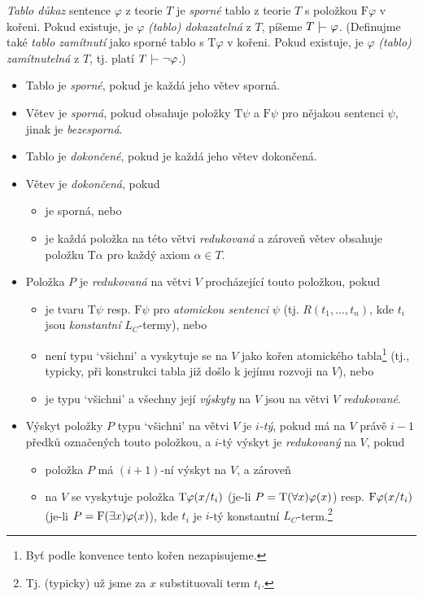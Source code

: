 \begin{definition}
    \emph{Tablo důkaz} sentence $\varphi$ z teorie $T$ je \emph{sporné} tablo z teorie $T$ s položkou $\mathrm{F}\varphi$ v kořeni. Pokud existuje, je $\varphi$ \emph{(tablo) dokazatelná} z $T$, píšeme $T\proves\varphi$. (Definujme také \emph{tablo zamítnutí} jako sporné tablo s $\mathrm{T}\varphi$ v kořeni. Pokud existuje, je $\varphi$ \emph{(tablo) zamítnutelná} z $T$, tj. platí $T\proves\neg\varphi$.)  
    \begin{itemize}
        \item Tablo je \emph{sporné}, pokud je každá jeho větev sporná.
        \item Větev je \emph{sporná}, pokud obsahuje položky $\mathrm{T}\psi$ a $\mathrm{F}\psi$ pro nějakou sentenci $\psi$, jinak je \emph{bezesporná}.
        \item Tablo je \emph{dokončené}, pokud je každá jeho větev dokončená.
        \item Větev je \emph{dokončená}, pokud 
        \begin{itemize}
            \item je sporná, nebo
            \item je každá položka na této větvi \emph{redukovaná} a zároveň větev obsahuje položku $\mathrm{T}\alpha$ pro každý axiom $\alpha\in T$.
        \end{itemize}
         
        \item Položka $P$ je \emph{redukovaná} na větvi $V$ procházející touto položkou, pokud 
        \begin{itemize}
            \item je tvaru $\mathrm{T}\psi$ resp. $\mathrm{F}\psi$ pro \emph{atomickou sentenci} $\psi$ (tj. $R(t_1,\dots,t_n)$, kde $t_i$ jsou \emph{konstantní} $L_C$-termy), nebo
            \item není typu `všichni' a vyskytuje se na $V$ jako kořen atomického tabla\footnote{Byť podle konvence tento kořen nezapisujeme.} (tj., typicky, při konstrukci tabla již došlo k jejímu rozvoji na $V$), nebo
            \item je typu `všichni' a všechny její \emph{výskyty} na $V$ jsou na větvi $V$ \emph{redukované}.
        \end{itemize}
        \item Výskyt položky $P$ typu `všichni' na větvi $V$ je \emph{$i$-tý}, pokud má na $V$ právě $i-1$ předků označených touto položkou, a $i$-tý výskyt je \emph{redukovaný} na $V$, pokud
        \begin{itemize}
            \item položka $P$ má $(i+1)$-ní výskyt na $V$, a zároveň
            \item na $V$ se vyskytuje položka $\mathrm{T}\varphi(x/t_i)$ (je-li $P=\mathrm{T}(\forall x)\varphi(x)$) resp. $\mathrm{F}\varphi(x/t_i)$ (je-li $P=\mathrm{F}(\exists x)\varphi(x)$), kde $t_i$ je $i$-tý konstantní $L_C$-term.\footnote{Tj. (typicky) už jsme za $x$ substituovali term $t_i$.}
        \end{itemize} 
    \end{itemize}
\end{definition}
